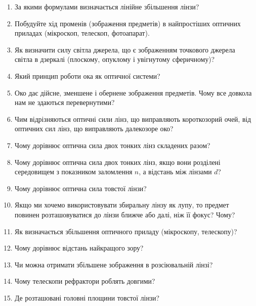 \documentclass[12pt]{article}
\begin{document}
\begin{enumerate}[label*=\bfseries\color{red!60!black}\arabic*.,ref=\arabic*, wide,leftmargin=*]
\item За якими формулами визначається лінійне збільшення лінзи?
\item Побудуйте хід променів (зображення предметів) в найпростіших оптичних приладах (мікроскоп, телескоп, фотоапарат).
\item Як визначити силу світла джерела, що є зображенням точкового джерела світла в дзеркалі (плоскому, опуклому і увігнутому сферичному)?
\item Який принцип роботи ока як оптичної системи?
\item Око дає дійсне, зменшене і обернене зображення предметів. Чому все довкола нам не здаються перевернутими?
\item Чим відрізняються оптичні сили лінз, що виправляють короткозорий очей, від оптичних сил лінз, що виправляють далекозоре око?
\item Чому дорівнює оптична сила двох тонких лінз складених разом?
\item Чому дорівнює оптична сила двох тонких лінз, якщо вони розділені середовищем з показником заломлення $n$, а відстань між лінзами $d$?
\item Чому дорівнює оптична сила товстої лінзи?
\item Якщо ми хочемо використовувати збиральну лінзу як лупу, то предмет повинен розташовуватися до лінзи ближче або далі, ніж її фокус? Чому?
\item Як визначається збільшення оптичного приладу (мікроскопу, телескопу)?
\item Чому дорівнює відстань найкращого зору?
\item Чи можна отримати збільшене зображення в розсіювальній лінзі?
\item Чому телескопи рефрактори роблять довгими?
\item Де розташовані головні площини товстої лінзи?
\end{enumerate}
\end{document}
